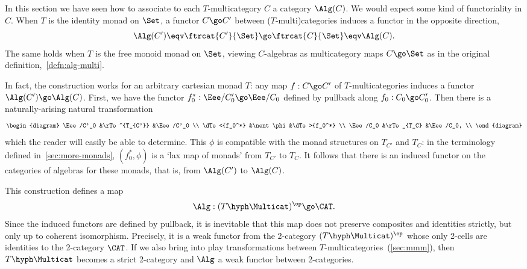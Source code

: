 In this section we have seen how to associate to each $T$-multicategory $C$
a category $\Alg(C)$.  We would expect some kind of functoriality in $C$.
When $T$ is the identity monad on $\Set$, a functor $C \go C'$ between
($T$-multi)categories induces a functor in the opposite direction,
\[
\Alg(C') \eqv \ftrcat{C'}{\Set} \go \ftrcat{C}{\Set} \eqv \Alg(C).
\]
The same holds when $T$ is the free monoid monad on $\Set$, viewing
$C$-algebras as multicategory maps $C\go \Set$ as in the original
definition,~\ref{defn:alg-multi}.

In fact, the construction works for an arbitrary cartesian monad $T$: any
map $f: C \go C'$ of $T$-multicategories induces a functor $\Alg(C') \go
\Alg(C)$.%
%
%
First, we have the functor $f_0^*: \Eee/C'_0 \go \Eee/C_0$ defined by
pullback along $f_0: C_0 \go C'_0$.  Then there is a naturally-arising
natural transformation
\[
\begin{diagram}
\Eee/C'_0		&\rTo^{T_{C'}}	&\Eee/C'_0	\\
\dTo<{f_0^*}		&\nent \phi		&\dTo>{f_0^*}		\\
\Eee/C_0		&\rTo_{T_C}		&\Eee/C_0,		\\
\end{diagram}
\]
which the reader will easily be able to determine.  This $\phi$ is
compatible with the monad structures on $T_{C'}$ and $T_C$: in the
terminology defined in~\ref{sec:more-monads}, $(f_0^*, \phi)$ is a `lax map
of monads' from $T_{C'}$ to $T_C$.  It follows that there is an induced
functor%
%
%
on the categories of algebras for these monads, that is, from
$\Alg(C')$ to $\Alg(C)$.

This construction defines a map
\[
\Alg: (T\hyph\Multicat)^\op \go \CAT.
\]
Since the induced functors are defined by pullback, it is inevitable that
this map does not preserve composites and identities strictly, but only up
to coherent isomorphism.  Precisely, it is a weak functor from the
2-category $(T\hyph\Multicat)^\op$ whose only 2-cells are identities to the
2-category $\CAT$.  If we also bring into play transformations between
$T$-multicategories~(\ref{sec:mmm}), then $T\hyph\Multicat$ becomes a
strict 2-category and $\Alg$ a weak functor between 2-categories.




